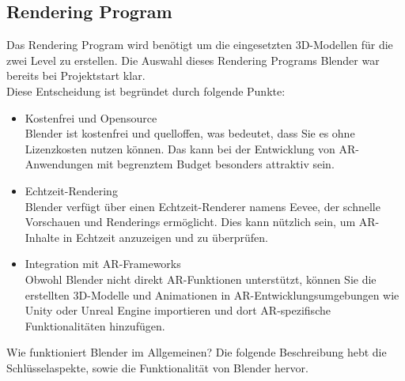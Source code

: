 \subsection{Rendering Program}
Das Rendering Program wird benötigt um die eingesetzten 3D-Modellen für die zwei
Level zu erstellen. Die Auswahl dieses Rendering Programs Blender war bereits bei Projektstart
klar. \\
Diese Entscheidung ist begründet durch folgende Punkte:
\begin{itemize}
    \item Kostenfrei und Opensource\\
    Blender ist kostenfrei und quelloffen, was bedeutet, dass Sie es ohne Lizenzkosten nutzen
    können. Das kann bei der Entwicklung von AR-Anwendungen mit begrenztem Budget besonders
    attraktiv sein.
    \item Echtzeit-Rendering\\
    Blender verfügt über einen Echtzeit-Renderer namens Eevee, der schnelle Vorschauen und
    Renderings ermöglicht. Dies kann nützlich sein, um AR-Inhalte in Echtzeit anzuzeigen und zu
    überprüfen.
    \item Integration mit AR-Frameworks\\
    Obwohl Blender nicht direkt AR-Funktionen unterstützt, können Sie die erstellten 3D-Modelle
    und Animationen in AR-Entwicklungsumgebungen wie Unity oder Unreal Engine importieren und
    dort AR-spezifische Funktionalitäten hinzufügen.
\end{itemize}
Wie funktioniert Blender im Allgemeinen? Die folgende Beschreibung hebt die Schlüsselaspekte, sowie die Funktionalität von Blender hervor.
